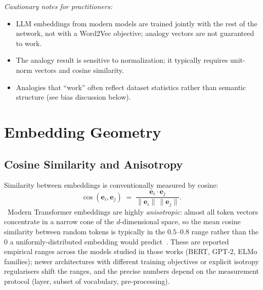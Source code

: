 \emph{Cautionary notes for practitioners:}
\begin{itemize}
  \item LLM embeddings from modern models are trained jointly with the
        rest of the network, not with a Word2Vec objective; analogy
        vectors are not guaranteed to work.
  \item The analogy result is sensitive to normalization; it typically
        requires unit-norm vectors and cosine similarity.
  \item Analogies that ``work'' often reflect dataset statistics rather
        than semantic structure (see bias discussion below).
\end{itemize}

\section{Embedding Geometry}

\subsection{Cosine Similarity and Anisotropy}

Similarity between embeddings is conventionally measured by cosine:
\begin{equation}
\cos(\mathbf{e}_i, \mathbf{e}_j) \;=\;
\frac{\mathbf{e}_i \cdot \mathbf{e}_j}
     {\|\mathbf{e}_i\|\,\|\mathbf{e}_j\|}.
\end{equation}
\Emp~Modern Transformer embeddings are highly \emph{anisotropic}: almost
all token vectors concentrate in a narrow cone of the $d$-dimensional
space, so the mean cosine similarity between random tokens is
typically in the $0.5$--$0.8$ range rather than the $0$ a uniformly-distributed
embedding would predict~\citep{ethayarajh2019contextual,gao2019representation}.
These are reported empirical ranges across the models studied in
those works (BERT, GPT-2, ELMo families); newer architectures with
different training objectives or explicit isotropy regularisers
shift the ranges, and the precise numbers depend on the measurement
protocol (layer, subset of vocabulary, pre-processing).

\begin{center}
\end{center}

